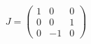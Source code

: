\begin{equation}
J=\left(\begin{array}{ccc}
1&0&0\\
0&0&1\\
0&-1&0\end{array}\right)
\end{equation}

